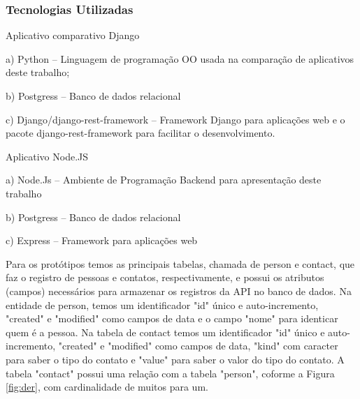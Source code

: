 \subsubsection{Tecnologias Utilizadas}


  Aplicativo comparativo Django
    
    \begin{compactitem}
      \item[a)] Python – Linguagem de programação OO usada na comparação de aplicativos deste trabalho;
      \item[b)] Postgress – Banco de dados relacional
      \item[c)] Django/django-rest-framework – Framework Django para aplicações web e o pacote django-rest-framework
      para facilitar o desenvolvimento.
    \end{compactitem}
    
  Aplicativo Node.JS
  
    \begin{compactitem}
      \item[a)] Node.Js – Ambiente de Programação Backend para apresentação deste trabalho
      \item[b)] Postgress – Banco de dados relacional
      \item[c)] Express – Framework para aplicações web
    \end{compactitem}
  
  Para os protótipos temos as principais tabelas, chamada de person e contact,
  que faz o registro de pessoas e contatos, respectivamente, e possui os atributos (campos) necessários
  para armazenar os registros da API no banco de dados. Na entidade de person, temos um identificador
  "id" único e auto-incremento, "created" e "modified" como campos de data e o campo
  "nome" para identicar quem é a pessoa. Na tabela de contact temos um identificador "id" único e auto-incremento,
  "created" e "modified" como campos de data, "kind" com caracter para saber o tipo do contato e "value" para 
  saber o valor do tipo do contato. A tabela "contact" possui uma relação com a tabela "person", coforme a Figura 
  \ref{fig:der}, com cardinalidade de muitos para um.

